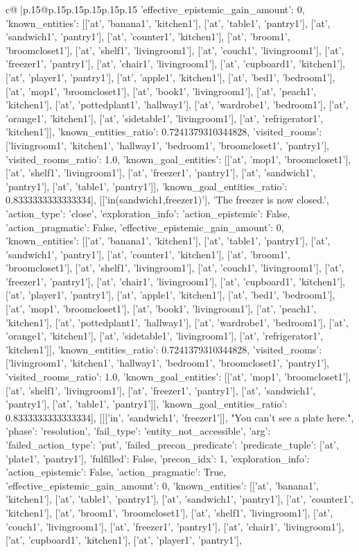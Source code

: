 \documentclass{article}
\begin{document}
{\begin{supertabular}{c@{$\;$}|p{.15\linewidth}@{}p{.15\linewidth}p{.15\linewidth}p{.15\linewidth}p{.15\linewidth}p{.15\linewidth}}
{{{'effective_epistemic_gain_amount': 0, 'known_entities': [['at', 'banana1', 'kitchen1'], ['at', 'table1', 'pantry1'], ['at', 'sandwich1', 'pantry1'], ['at', 'counter1', 'kitchen1'], ['at', 'broom1', 'broomcloset1'], ['at', 'shelf1', 'livingroom1'], ['at', 'couch1', 'livingroom1'], ['at', 'freezer1', 'pantry1'], ['at', 'chair1', 'livingroom1'], ['at', 'cupboard1', 'kitchen1'], ['at', 'player1', 'pantry1'], ['at', 'apple1', 'kitchen1'], ['at', 'bed1', 'bedroom1'], ['at', 'mop1', 'broomcloset1'], ['at', 'book1', 'livingroom1'], ['at', 'peach1', 'kitchen1'], ['at', 'pottedplant1', 'hallway1'], ['at', 'wardrobe1', 'bedroom1'], ['at', 'orange1', 'kitchen1'], ['at', 'sidetable1', 'livingroom1'], ['at', 'refrigerator1', 'kitchen1']], 'known_entities_ratio': 0.7241379310344828, 'visited_rooms': ['livingroom1', 'kitchen1', 'hallway1', 'bedroom1', 'broomcloset1', 'pantry1'], 'visited_rooms_ratio': 1.0, 'known_goal_entities': [['at', 'mop1', 'broomcloset1'], ['at', 'shelf1', 'livingroom1'], ['at', 'freezer1', 'pantry1'], ['at', 'sandwich1', 'pantry1'], ['at', 'table1', 'pantry1']], 'known_goal_entities_ratio': 0.8333333333333334}}], [['in(sandwich1,freezer1)'], 'The freezer is now closed.', {'action_type': 'close', 'exploration_info': {'action_epistemic': False, 'action_pragmatic': False, 'effective_epistemic_gain_amount': 0, 'known_entities': [['at', 'banana1', 'kitchen1'], ['at', 'table1', 'pantry1'], ['at', 'sandwich1', 'pantry1'], ['at', 'counter1', 'kitchen1'], ['at', 'broom1', 'broomcloset1'], ['at', 'shelf1', 'livingroom1'], ['at', 'couch1', 'livingroom1'], ['at', 'freezer1', 'pantry1'], ['at', 'chair1', 'livingroom1'], ['at', 'cupboard1', 'kitchen1'], ['at', 'player1', 'pantry1'], ['at', 'apple1', 'kitchen1'], ['at', 'bed1', 'bedroom1'], ['at', 'mop1', 'broomcloset1'], ['at', 'book1', 'livingroom1'], ['at', 'peach1', 'kitchen1'], ['at', 'pottedplant1', 'hallway1'], ['at', 'wardrobe1', 'bedroom1'], ['at', 'orange1', 'kitchen1'], ['at', 'sidetable1', 'livingroom1'], ['at', 'refrigerator1', 'kitchen1']], 'known_entities_ratio': 0.7241379310344828, 'visited_rooms': ['livingroom1', 'kitchen1', 'hallway1', 'bedroom1', 'broomcloset1', 'pantry1'], 'visited_rooms_ratio': 1.0, 'known_goal_entities': [['at', 'mop1', 'broomcloset1'], ['at', 'shelf1', 'livingroom1'], ['at', 'freezer1', 'pantry1'], ['at', 'sandwich1', 'pantry1'], ['at', 'table1', 'pantry1']], 'known_goal_entities_ratio': 0.8333333333333334}}], [[['in', 'sandwich1', 'freezer1']], "You can't see a plate here.", {'phase': 'resolution', 'fail_type': 'entity_not_accessible', 'arg': {'failed_action_type': 'put', 'failed_precon_predicate': {'predicate_tuple': ['at', 'plate1', 'pantry1'], 'fulfilled': False, 'precon_idx': 1}}, 'exploration_info': {'action_epistemic': False, 'action_pragmatic': True, 'effective_epistemic_gain_amount': 0, 'known_entities': [['at', 'banana1', 'kitchen1'], ['at', 'table1', 'pantry1'], ['at', 'sandwich1', 'pantry1'], ['at', 'counter1', 'kitchen1'], ['at', 'broom1', 'broomcloset1'], ['at', 'shelf1', 'livingroom1'], ['at', 'couch1', 'livingroom1'], ['at', 'freezer1', 'pantry1'], ['at', 'chair1', 'livingroom1'], ['at', 'cupboard1', 'kitchen1'], ['at', 'player1', 'pantry1'], }}}
\end{supertabular}}
\end{document}
